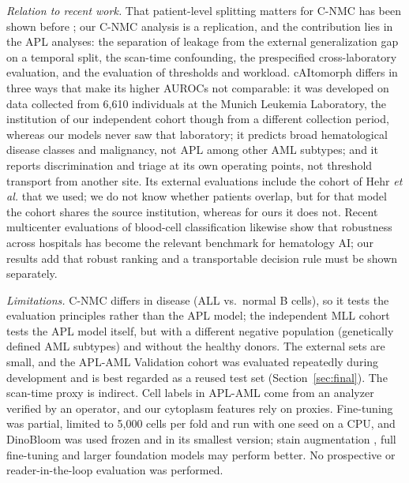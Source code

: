 \documentclass[journal]{IEEEtran}
\begin{document}
\emph{Relation to recent work.} That patient-level splitting matters for C-NMC has been shown before \cite{albzour2026leakage}; our C-NMC analysis is a replication, and the contribution lies in the APL analyses: the separation of leakage from the external generalization gap on a temporal split, the scan-time confounding, the prespecified cross-laboratory evaluation, and the evaluation of thresholds and workload. cAItomorph \cite{dasdelen2026caitomorph} differs in three ways that make its higher AUROCs not comparable: it was developed on data collected from 6,610 individuals at the Munich Leukemia Laboratory, the institution of our independent cohort though from a different collection period, whereas our models never saw that laboratory; it predicts broad hematological disease classes and malignancy, not APL among other AML subtypes; and it reports discrimination and triage at its own operating points, not threshold transport from another site. Its external evaluations include the cohort of Hehr \emph{et al.} that we used; we do not know whether patients overlap, but for that model the cohort shares the source institution, whereas for ours it does not. Recent multicenter evaluations of blood-cell classification \cite{ravzanaadii2026multicenter} likewise show that robustness across hospitals has become the relevant benchmark for hematology AI; our results add that robust ranking and a transportable decision rule must be shown separately.

\emph{Limitations.} C-NMC differs in disease (ALL vs.\ normal B cells), so it tests the evaluation principles rather than the APL model; the independent MLL cohort tests the APL model itself, but with a different negative population (genetically defined AML subtypes) and without the healthy donors. The external sets are small, and the APL-AML Validation cohort was evaluated repeatedly during development and is best regarded as a reused test set (Section~\ref{sec:final}). The scan-time proxy is indirect. Cell labels in APL-AML come from an analyzer verified by an operator, and our cytoplasm features rely on proxies. Fine-tuning was partial, limited to 5,000 cells per fold and run with one seed on a CPU, and DinoBloom was used frozen and in its smallest version; stain augmentation \cite{tellez2019stain}, full fine-tuning and larger foundation models may perform better. No prospective or reader-in-the-loop evaluation was performed.

\end{document}
